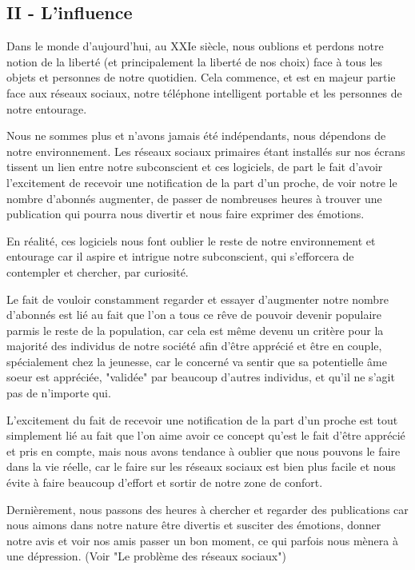\documentclass[twocolumn, french]{article}
\begin{document}
\subsection*{II - L'influence}
Dans le monde d'aujourd'hui, au XXIe siècle, nous oublions et perdons notre notion de la 
liberté (et principalement la liberté de nos choix) face à tous les objets et personnes de notre 
quotidien. Cela commence, et est en majeur partie face aux réseaux sociaux, notre téléphone 
intelligent portable et les personnes de notre entourage. 

Nous ne sommes plus et n'avons jamais été indépendants, nous dépendons de notre environnement.
Les réseaux sociaux primaires étant installés sur nos écrans tissent un lien entre notre 
subconscient et ces logiciels, de part le fait d'avoir l'excitement de recevoir une 
notification de la part d'un proche, de voir notre le nombre d'abonnés augmenter, de passer de 
nombreuses heures à trouver une publication qui pourra nous divertir et nous faire exprimer
des émotions.  

En réalité, ces logiciels nous font oublier le reste de notre environnement et entourage car il 
aspire et intrigue notre subconscient, qui s'efforcera de contempler et chercher, par curiosité.

Le fait de vouloir constamment regarder et essayer d'augmenter notre nombre d'abonnés est lié au
fait que l'on a tous ce rêve de pouvoir devenir populaire parmis le reste de la population, car cela 
est même devenu un critère pour la majorité des individus de notre société afin d'être apprécié et être 
en couple, spécialement chez la jeunesse, car le concerné va sentir que sa potentielle âme soeur
est appréciée, "validée" par beaucoup d'autres individus, et qu'il ne s'agit pas de n'importe qui.

L'excitement du fait de recevoir une notification de la part d'un proche est tout simplement lié 
au fait que l'on aime avoir ce concept qu'est le fait d'être apprécié et pris en compte, mais nous 
avons tendance à oublier que nous pouvons le faire dans la vie réelle, car le faire sur les 
réseaux sociaux est bien plus facile et nous évite à faire beaucoup d'effort et sortir de notre 
zone de confort. 

Dernièrement, nous passons des heures à chercher et regarder des publications 
car nous aimons dans notre nature être divertis et susciter des émotions, donner notre avis et voir 
nos amis passer un bon moment, ce qui parfois nous mènera à une dépression. (Voir "Le problème 
des réseaux sociaux") 
\end{document}
